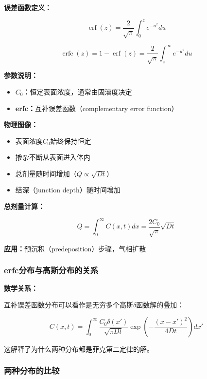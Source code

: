\documentclass[UTF8,12pt,a4paper]{ctexart}
\begin{document}
\textbf{误差函数定义：}

\begin{equation}
\operatorname{erf}(z) = \frac{2}{\sqrt{\pi}} \int_0^z e^{-u^2} du
\end{equation}

\begin{equation}
\operatorname{erfc}(z) = 1 - \operatorname{erf}(z) = \frac{2}{\sqrt{\pi}} \int_z^\infty e^{-u^2} du
\end{equation}

\textbf{参数说明：}
\begin{itemize}
    \item \textbf{$C_0$：}恒定表面浓度，通常由固溶度决定
    \item \textbf{erfc：}互补误差函数（complementary error function）
\end{itemize}

\textbf{物理图像：}
\begin{itemize}
    \item 表面浓度$C_0$始终保持恒定
    \item 掺杂不断从表面进入体内
    \item 总剂量随时间增加（$Q \propto \sqrt{Dt}$）
    \item 结深（junction depth）随时间增加
\end{itemize}

\textbf{总剂量计算：}

\begin{equation}
Q = \int_0^\infty C(x,t) dx = \frac{2C_0}{\sqrt{\pi}} \sqrt{Dt}
\end{equation}

\textbf{应用：}预沉积（predeposition）步骤，气相扩散

\subsubsection{erfc分布与高斯分布的关系}

\textbf{数学关系：}

互补误差函数分布可以看作是无穷多个高斯$\delta$函数解的叠加：

\begin{equation}
C(x,t) = \int_0^\infty \frac{C_0 \delta(x')}{\sqrt{\pi Dt}} \exp\left(-\frac{(x-x')^2}{4Dt}\right) dx'
\end{equation}

这解释了为什么两种分布都是菲克第二定律的解。

\subsubsection{两种分布的比较}
\end{document}
